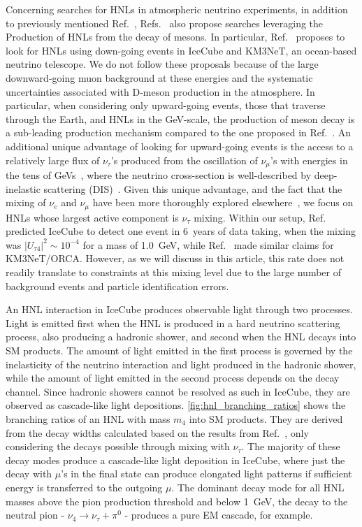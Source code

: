 \documentclass[
    aps,
    prd,
    reprint,
    amsmath,
    amssymb,
    nofootinbib,
    superscriptaddress,
    floatfix
]{revtex4-2}
\newcommand{\gev}{\giga\electronvolt}
\def\nomathut4{|U_{\tau4}|^2}
\begin{document}
Concerning searches for HNLs in atmospheric neutrino experiments, in addition to previously mentioned Ref.~\cite{Coloma:2017ppo}, Refs.~\cite{Boiarska:2021yho,Coloma:2019htx,Arguelles:2019ziu} also propose searches leveraging the Production of HNLs from the decay of mesons. In particular, Ref.~\cite{Boiarska:2021yho} proposes to look for HNLs using down-going events in IceCube and KM3NeT, an ocean-based neutrino telescope.
We do not follow these proposals because of the large downward-going muon background at these energies and the systematic uncertainties associated with D-meson production in the atmosphere.
In particular, when considering only upward-going events, those that traverse through the Earth, and HNLs in the GeV-scale, the production of meson decay is a sub-leading production mechanism compared to the one proposed in Ref.~\cite{Coloma:2017ppo}.
An additional unique advantage of looking for upward-going events is the access to a relatively large flux of $\nu_\tau$'s produced from the oscillation of $\nu_\mu$'s with energies in the tens of GeVs~\cite{IceCubeCollaboration:2023wtb}, where the neutrino cross-section is well-described by deep-inelastic scattering (DIS)~\cite{Formaggio:2012cpf}.
Given this unique advantage, and the fact that the mixing of $\nu_e$ and $\nu_\mu$ have been more thoroughly explored elsewhere~\cite{ParticleDataGroup:2024cfk}, we focus on HNLs whose largest active component is $\nu_\tau$ mixing.
Within our setup, Ref.~\cite{Coloma:2017ppo} predicted IceCube to detect one event in \SI{6}{years} of data taking, when the mixing was $\nomathut4\sim10^{-4}$ for a mass of \SI{1.0}{\gev}, while Ref.~\cite{Boiarska:2021yho} made similar claims for KM3NeT/ORCA.
However, as we will discuss in this article, this rate does not readily translate to constraints at this mixing level due to the large number of background events and particle identification errors. 

An HNL interaction in IceCube produces observable light through two processes.
Light is emitted first when the HNL is produced in a hard neutrino scattering process, also producing a hadronic shower, and second when the HNL decays into SM products.
The amount of light emitted in the first process is governed by the inelasticity of the neutrino interaction and light produced in the hadronic shower, while the amount of light emitted in the second process depends on the decay channel.
Since hadronic showers cannot be resolved as such in IceCube, they are observed as cascade-like light depositions. \cref{fig:hnl_branching_ratios} shows the branching ratios of an HNL with mass $m_4$ into SM products. They are derived from the decay widths calculated based on the results from Ref.~\cite{Coloma:2020lgy}, only considering the decays possible through mixing with $\nu_\tau$.
The majority of these decay modes produce a cascade-like light deposition in IceCube, where just the decay with $\mu$'s in the final state can produce elongated light patterns if sufficient energy is transferred to the outgoing $\mu$. 
The dominant decay mode for all HNL masses above the pion production threshold and below \SI{1}{\gev}, the decay to the neutral pion - $\nu_4 \to \nu_\tau + \pi^0$ - produces a pure EM cascade, for example.
\end{document}
